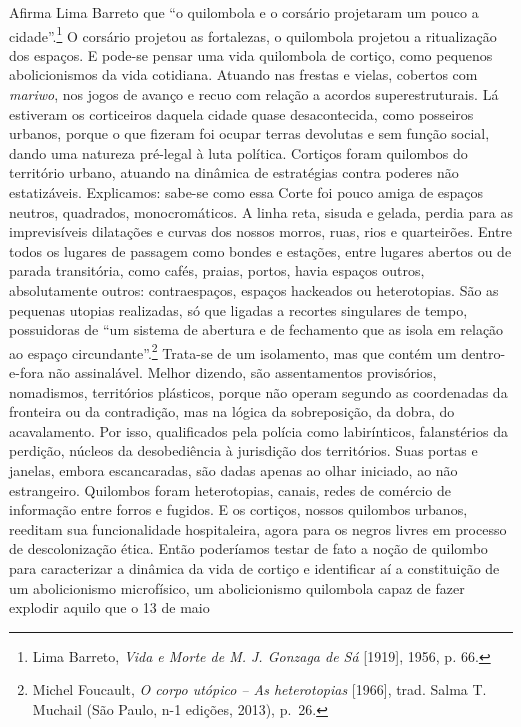 Afirma Lima Barreto que ``o quilombola e o corsário projetaram um pouco
a cidade''.\footnote{Lima Barreto, \emph{Vida e Morte de M. J. Gonzaga
  de Sá} {[}1919{]}, 1956, p\emph{.} 66.} O corsário projetou as
fortalezas, o quilombola projetou a ritualização dos espaços. E pode-se
pensar uma vida quilombola de cortiço, como pequenos abolicionismos da
vida cotidiana. Atuando nas frestas e vielas, cobertos com
\emph{mariwo}, nos jogos de avanço e recuo com relação a acordos
superestruturais. Lá estiveram os corticeiros daquela cidade quase
desacontecida, como posseiros urbanos, porque o que fizeram foi ocupar
terras devolutas e sem função social, dando uma natureza pré-legal à
luta política. Cortiços foram quilombos do território urbano, atuando na
dinâmica de estratégias contra poderes não estatizáveis. Explicamos:
sabe-se como essa Corte foi pouco amiga de espaços neutros, quadrados,
monocromáticos. A linha reta, sisuda e gelada, perdia para as
imprevisíveis dilatações e curvas dos nossos morros, ruas, rios e
quarteirões. Entre todos os lugares de passagem como bondes e estações,
entre lugares abertos ou de parada transitória, como cafés, praias,
portos, havia espaços outros, absolutamente outros: contraespaços,
espaços hackeados ou heterotopias. São as pequenas utopias realizadas,
só que ligadas a recortes singulares de tempo, possuidoras de ``um
sistema de abertura e de fechamento que as isola em relação ao espaço
circundante''.\footnote{Michel Foucault, \emph{O corpo utópico -- As
  heterotopias} {[}1966{]}, trad. Salma T. Muchail (São Paulo, n-1
  edições, 2013), p.~26.} Trata-se de um isolamento, mas que contém um
dentro-e-fora não assinalável. Melhor dizendo, são assentamentos
provisórios, nomadismos, territórios plásticos, porque não operam
segundo as coordenadas da fronteira ou da contradição, mas na lógica da
sobreposição, da dobra, do acavalamento. Por isso, qualificados pela
polícia como labirínticos, falanstérios da perdição, núcleos da
desobediência à jurisdição dos territórios. Suas portas e janelas,
embora escancaradas, são dadas apenas ao olhar iniciado, ao não
estrangeiro. Quilombos foram heterotopias, canais, redes de comércio de
informação entre forros e fugidos. E os cortiços, nossos quilombos
urbanos, reeditam sua funcionalidade hospitaleira, agora para os negros
livres em processo de descolonização ética. Então poderíamos testar de
fato a noção de quilombo para caracterizar a dinâmica da vida de cortiço
e identificar aí a constituição de um abolicionismo microfísico, um
abolicionismo quilombola capaz de fazer explodir aquilo que o 13 de maio
